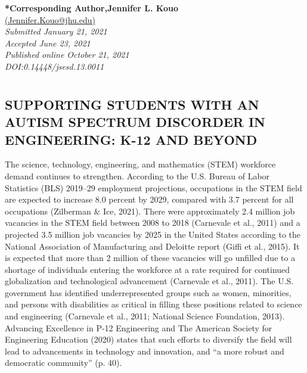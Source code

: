 \documentclass[11.5pt]{sig-alternate}
\begin{document}
\textbf{*Corresponding Author,Jennifer L. Kouo  }\\
\href{mailto: Jennifer.Kouo@jhu.edu }{(Jennifer.Kouo@jhu.edu)} \\
\textit{Submitted January 21, 2021 }\\
\textit{Accepted June 23, 2021} \\
\textit{Published online October 21, 2021} \\
\textit{DOI:0.14448/jsesd.13.0011} \\
\pagebreak
\pagebreak

\vspace{5mm}
\section*{\vspace{140mm}}
\begin{large}

\section*{SUPPORTING STUDENTS WITH AN AUTISM SPECTRUM DISCORDER IN ENGINEERING: K-12 AND BEYOND}

The science, technology, engineering, and mathematics (STEM) workforce demand continues to strengthen. According to the U.S. Bureau of Labor Statistics (BLS) 2019–29 employment projections, occupations in the STEM field are expected to increase 8.0 percent by 2029, compared with 3.7 percent for all occupations (Zilberman \& Ice, 2021). There were approximately 2.4 million job vacancies in the STEM field between 2008 to 2018 (Carnevale et al., 2011) and a projected 3.5 million job vacancies by 2025 in the United States according to the National Association of Manufacturing and Deloitte report (Giffi et al., 2015). It is expected that more than 2 million of these vacancies will go unfilled due to a shortage of individuals entering the workforce at a rate required for continued globalization and technological advancement (Carnevale et al., 2011). The U.S. government has identified underrepresented groups such as women, minorities, and persons with disabilities as critical in filling these positions related to science and engineering (Carnevale et al., 2011; National Science Foundation, 2013). Advancing Excellence in P-12 Engineering and The American Society for Engineering Education (2020) states that such efforts to diversify the field will lead to advancements in technology and innovation, and “a more robust and democratic community” (p. 40). 


\end{large}
\end{document}
